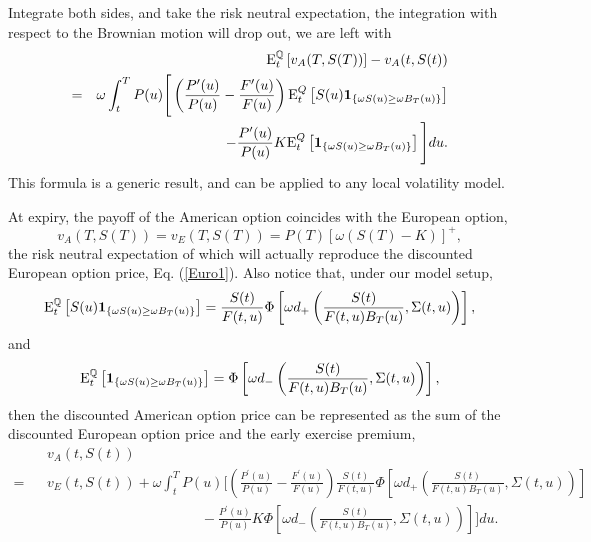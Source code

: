 \documentclass[12pt]{article}
\begin{document}
    Integrate both sides, and take the risk neutral expectation, the integration with respect to the Brownian motion
    will drop out, we are left with
    \begin{eqnarray}
      &&{\rm E}_t^{\mathbb{Q}}\left[v_A(T,S(T))\right]-v_A(t,S(t)) \nonumber\\
      = &&\omega\int_t^T P(u)\Bigg[\left(\frac{P^{\prime}(u)}{P(u)}-\frac{F^{\prime}(u)}{F(u)}\right)
                          {\rm E}_t^Q\left[S(u)\mathbf{1}_{\{\omega S(u)\geq\omega B_T(u)\}}\right]\nonumber\\
        &&\quad\quad\quad\quad\quad\quad\quad- \frac{P^{\prime}(u)}{P(u)} K
                          {\rm E}_t^Q\left[\mathbf{1}_{\{\omega S(u)\geq\omega B_T(u)\}}\right] \Bigg]du.
    \end{eqnarray}
    This formula is a generic result, and can be applied to any local volatility model.

    At expiry, the payoff of the American option coincides with the European option,
    \begin{equation}
      v_A(T,S(T)) = v_E(T,S(T))=P(T)\left[\omega\left(S(T)-K\right)\right]^+,
    \end{equation}
    the risk neutral expectation of which will actually reproduce the discounted European option price, Eq. (\ref{Euro1}).
    Also notice that, under our model setup,
    \begin{equation}
      {\rm E}_t^{\mathbb{Q}}\left[S(u)\mathbf{1}_{\{\omega S(u)\geq\omega B_T(u)\}}\right]
       = \frac{S(t)}{F(t,u)}\Phi\left[\omega d_+\left(\frac{S(t)}{F(t,u)B_T(u)}, \Sigma(t,u)\right)\right],
    \end{equation}
    and
    \begin{equation}
      {\rm E}_t^{\mathbb{Q}}\left[\mathbf{1}_{\{\omega S(u)\geq\omega B_T(u)\}}\right]
       = \Phi\left[\omega d_-\left(\frac{S(t)}{F(t,u)B_T(u)}, \Sigma(t,u)\right)\right],
    \end{equation}
    then the discounted American option price can be represented as the sum of the discounted European
    option price and the early exercise premium,
    \begin{eqnarray}
      \label{EEP}
      &&v_A(t,S(t))\nonumber\\
      =&&v_E(t,S(t))+\omega\int_t^TP(u)\Bigg[\left(\frac{P^{\prime}(u)}{P(u)}-\frac{F^{\prime}(u)}{F(u)}\right)
      \frac{S(t)}{F(t,u)}\Phi\left[\omega d_+\left(\frac{S(t)}{F(t,u)B_T(u)}, \Sigma(t,u)\right)\right]\nonumber\\
      &&\quad\quad\quad\quad\quad\quad\quad\quad\quad\quad\quad - \frac{P^{\prime}(u)}{P(u)} K
      \Phi\left[\omega d_-\left(\frac{S(t)}{F(t,u)B_T(u)}, \Sigma(t,u)\right)\right] \Bigg]du.
    \end{eqnarray}
\end{document}
